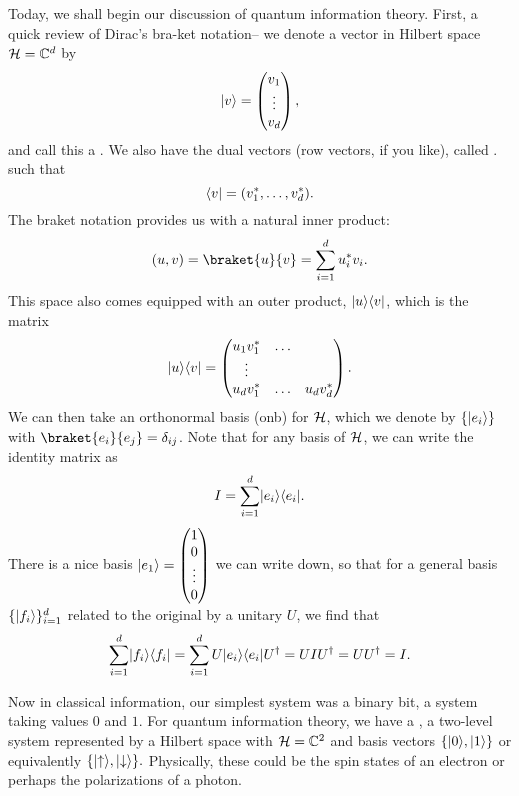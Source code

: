 Today, we shall begin our discussion of quantum information theory. First, a quick review of Dirac's bra-ket notation-- we denote a vector in Hilbert space $\mathcal H =\mathbb{C}^d$ by
\begin{equation}
    \lvert v\rangle = \begin{pmatrix}
    v_1\\ \vdots \\ v_d
    \end{pmatrix},
\end{equation}
and call this a . We also have the dual vectors (row vectors, if you like), called . such that
\begin{equation}
    \langle v\rvert=(v_1^*, \ldots, v_d^*).
\end{equation}
The braket notation provides us with a natural inner product:
\begin{equation}
    (u,v)=\braket{u}{v}=\sum_{i=1}^d u_i^* v_i.
\end{equation}
This space also comes equipped with an outer product, $\lvert u\rangle\langle v\rvert$, which is the matrix
\begin{equation}
    \lvert u\rangle\langle v\rvert =\begin{pmatrix}
    u_1 v_1^* &\ldots&\\
    \vdots\\
    u_d v_1^* &\ldots &u_d v_d^*
    \end{pmatrix}.
\end{equation}
We can then take an orthonormal basis (onb) for $\mathcal H$, which we denote by $\{\lvert e_i\rangle\}$ with $\braket{e_i}{e_j}=\delta_{ij}$. Note that for any basis of $\mathcal H$, we can write the identity matrix as
\begin{equation}
    I=\sum_{i=1}^d \lvert e_i\rangle\langle e_i\rvert.
\end{equation}
There is a nice basis $\lvert e_1\rangle=\begin{pmatrix}1\\0\\\vdots\\0\end{pmatrix}$ we can write down,
so that for a general basis $\{\lvert f_i\rangle\}_{i=1}^d$ related to the original by a unitary $U$, we find that
\begin{equation}
    \sum_{i=1}^d \lvert f_i\rangle\langle f_i\rvert=\sum_{i=1}^d U \lvert e_i\rangle \langle e_i\rvert U^\dagger = U I U^\dagger =UU^\dagger = I.
\end{equation}

Now in classical information, our simplest system was a binary bit, a system taking values $0$ and $1$. For quantum information theory, we have a , a two-level system represented by a Hilbert space with $\mathcal H=\mathbb{C}^2$ and basis vectors $\{\lvert0\rangle,\lvert1\rangle\}$ or equivalently $\{\lvert\uparrow\rangle,\lvert\downarrow\rangle\}.$ Physically, these could be the spin states of an electron or perhaps the polarizations of a photon.

